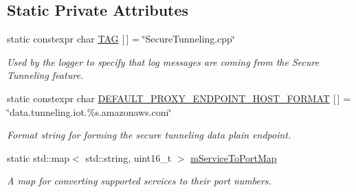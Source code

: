 \subsection*{Static Private Attributes}
\begin{DoxyCompactItemize}
\item 
\mbox{\label{class_aws_1_1_iot_1_1_device_client_1_1_secure_tunneling_1_1_secure_tunneling_feature_a7d700b7591d51240c6aca5b579ab810e}} 
static constexpr char \hyperlink{class_aws_1_1_iot_1_1_device_client_1_1_secure_tunneling_1_1_secure_tunneling_feature_a7d700b7591d51240c6aca5b579ab810e}{T\+AG} \mbox{[}$\,$\mbox{]} = \char`\"{}Secure\+Tunneling.\+cpp\char`\"{}
\begin{DoxyCompactList}\small\item\em Used by the logger to specify that log messages are coming from the Secure Tunneling feature. \end{DoxyCompactList}\item 
\mbox{\label{class_aws_1_1_iot_1_1_device_client_1_1_secure_tunneling_1_1_secure_tunneling_feature_a8834fc640c69a3ed47fc57e3b59a8923}} 
static constexpr char \hyperlink{class_aws_1_1_iot_1_1_device_client_1_1_secure_tunneling_1_1_secure_tunneling_feature_a8834fc640c69a3ed47fc57e3b59a8923}{D\+E\+F\+A\+U\+L\+T\+\_\+\+P\+R\+O\+X\+Y\+\_\+\+E\+N\+D\+P\+O\+I\+N\+T\+\_\+\+H\+O\+S\+T\+\_\+\+F\+O\+R\+M\+AT} \mbox{[}$\,$\mbox{]} = \char`\"{}data.\+tunneling.\+iot.\%s.\+amazonaws.\+com\char`\"{}
\begin{DoxyCompactList}\small\item\em Format string for forming the secure tunneling data plain endpoint. \end{DoxyCompactList}\item 
\mbox{\label{class_aws_1_1_iot_1_1_device_client_1_1_secure_tunneling_1_1_secure_tunneling_feature_aeaafb01665e10b726f93f5247767193e}} 
static std\+::map$<$ std\+::string, uint16\+\_\+t $>$ \hyperlink{class_aws_1_1_iot_1_1_device_client_1_1_secure_tunneling_1_1_secure_tunneling_feature_aeaafb01665e10b726f93f5247767193e}{m\+Service\+To\+Port\+Map}
\begin{DoxyCompactList}\small\item\em A map for converting supported services to their port numbers. \end{DoxyCompactList}\end{DoxyCompactItemize}


